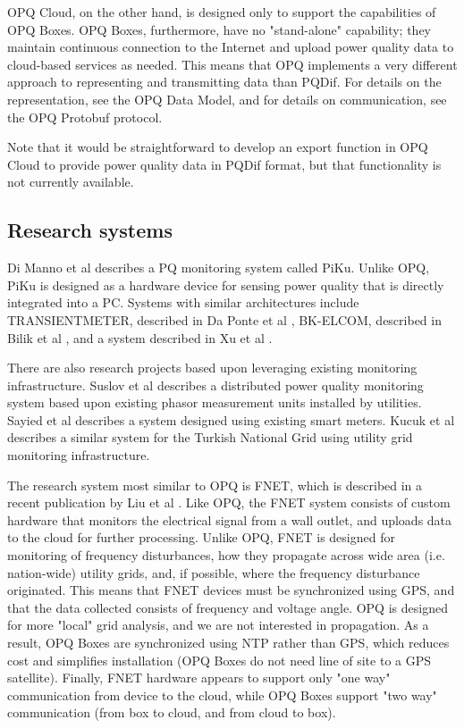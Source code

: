 OPQ Cloud, on the other hand, is designed only to support the capabilities of OPQ Boxes. OPQ Boxes, furthermore, have no "stand-alone" capability; they maintain continuous connection to the Internet and upload power quality data to cloud-based services as needed. This means that OPQ implements a very different approach to representing and transmitting data than PQDif. For details on the representation, see the OPQ Data Model, and for details on communication, see the OPQ Protobuf protocol.

Note that it would be straightforward to develop an export function in OPQ Cloud to provide power quality data in PQDif format, but that functionality is not currently available.

\subsection{Research systems}

Di Manno et al \cite{di_manno_user_2015} describes a PQ monitoring system called PiKu. Unlike OPQ, PiKu is designed as a hardware device for sensing power quality that is directly integrated into a PC. Systems with similar architectures include TRANSIENTMETER, described in Da Ponte et al \cite{daponte_transientmeter:_2000}, BK-ELCOM, described in Bilik et al \cite{bilik_modular_2007}, and a system described in Xu et al \cite{xu_distributed_2012}.

There are also research projects based upon leveraging existing monitoring infrastructure. Suslov et al \cite{suslov_distributed_2014} describes a distributed power quality monitoring system based upon existing phasor measurement units installed by utilities. Sayied et al \cite{sayied_power_2013} describes a system designed using existing smart meters. Kucuk et al \cite{kucuk_extensible_2010} describes a similar system for the Turkish National Grid using utility grid monitoring infrastructure.

The research system most similar to OPQ is FNET, which is described in a recent publication by Liu et al \cite{liu_distribution_2017}. Like OPQ, the FNET system consists of custom hardware that monitors the electrical signal from a wall outlet, and uploads data to the cloud for further processing. Unlike OPQ, FNET is designed for monitoring of frequency disturbances, how they propagate across wide area (i.e. nation-wide) utility grids, and, if possible, where the frequency disturbance originated. This means that FNET devices must be synchronized using GPS, and that the data collected consists of frequency and voltage angle. OPQ is designed for more "local" grid analysis, and we are not interested in propagation. As a result, OPQ Boxes are synchronized using NTP rather than GPS, which reduces cost and simplifies installation (OPQ Boxes do not need line of site to a GPS satellite). Finally, FNET hardware appears to support only "one way" communication from device to the cloud, while OPQ Boxes support "two way" communication (from box to cloud, and from cloud to box).
